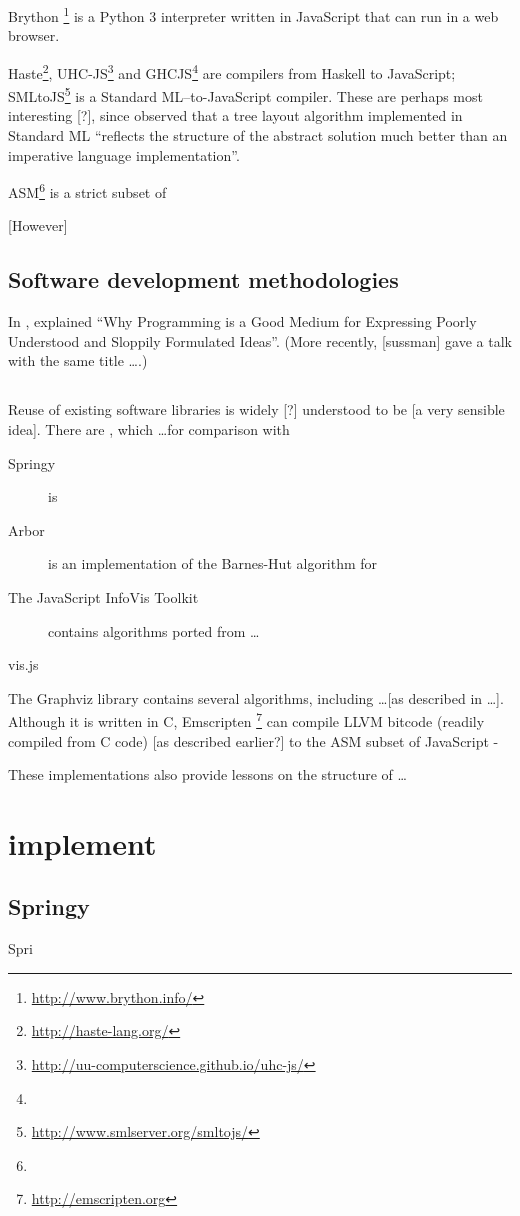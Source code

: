 \documentclass[authoryearcitations]{UoYCSproject}
\begin{document}
Brython \footnote{\url{http://www.brython.info/}} is a Python 3 interpreter written in JavaScript that can run in a web browser. 

Haste\footnote{\url{http://haste-lang.org/}}, UHC-JS\footnote{\url{http://uu-computerscience.github.io/uhc-js/}} and GHCJS\footnote{} are compilers from Haskell to JavaScript; SMLtoJS\footnote{\url{http://www.smlserver.org/smltojs/}} is a Standard ML--to-JavaScript compiler. These are perhaps most interesting [?], since \citet{kennedyfuntrees} observed that a tree layout algorithm implemented in Standard ML ``reflects the structure of the abstract solution much better than an imperative language implementation''.



ASM\footnote{} is a strict subset of 

[However]


\section{Software development methodologies}

In \citeyear{67poorslop}, \citet*{67poorslop} explained ``Why Programming is a Good Medium for Expressing Poorly Understood and Sloppily Formulated Ideas''.
(More recently, [sussman] gave a talk with the same title \ldots {}.)


\section{}

Reuse of existing software libraries is widely [?] understood to be [a very sensible idea]. There are , which \ldots for comparison with 

\begin{description}
  \item[Springy] is
  \item[Arbor] is an implementation of the Barnes-Hut algorithm for 
  \item[The JavaScript InfoVis Toolkit] contains algorithms ported from \ldots
  \item[vis.js]
\end{description}

The Graphviz library contains several algorithms, including \ldots [as described in \ldots]. Although it is written in C, Emscripten \footnote{\url{http://emscripten.org}} can compile LLVM bitcode (readily compiled from C code) [as described earlier?] to the ASM subset of JavaScript -

These implementations also provide lessons on the structure of \ldots


\chapter{implement}

\section{Springy}

Spri



\end{document}
